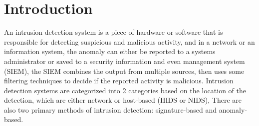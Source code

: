 %
%
%
%










\section{Introduction}
An intrusion detection system is a piece of hardware or software that is responsible for detecting suspicious and malicious activity, and in a network or an information system, the anomaly can either be reported to a systems administrator or saved to a security information and even management system (SIEM), the SIEM combines the output from multiple sources, then uses some filtering techniques to decide if the reported activity is malicious. \cite{1}Intrusion detection systems are categorized into 2 categories based on the location of the detection, which are either network or host-based (HIDS or NIDS), There are also two primary methods of intrusion detection: signature-based and anomaly-based. \cite{2}
